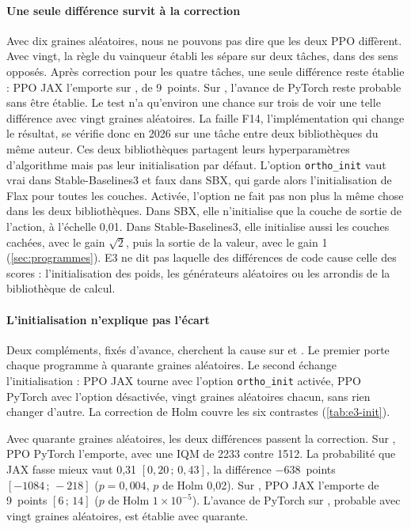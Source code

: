 \paragraph{Une seule différence survit à la correction}
Avec dix graines aléatoires, nous ne pouvons pas dire que les deux PPO diffèrent. Avec vingt, la
règle du vainqueur établi les sépare sur deux tâches, dans des sens opposés. Après correction pour les quatre
tâches, une seule différence reste établie : PPO JAX l'emporte sur , de 9~points. Sur
, l'avance de PyTorch reste probable sans être établie. Le test n'a qu'environ une chance sur
trois de voir une telle différence avec vingt graines aléatoires. La faille F14, l'implémentation qui change
le résultat, se vérifie donc en 2026 sur une tâche entre deux bibliothèques du même auteur. Ces deux
bibliothèques partagent leurs hyperparamètres d'algorithme mais pas leur initialisation par défaut. L'option
\texttt{ortho\_init} vaut vrai dans Stable-Baselines3 et faux dans SBX, qui garde alors l'initialisation de
Flax pour toutes les couches. Activée, l'option ne fait pas non plus la même chose dans les deux
bibliothèques. Dans SBX, elle n'initialise que la couche de sortie de l'action, à l'échelle 0,01. Dans
Stable-Baselines3, elle initialise aussi les couches cachées, avec le gain $\sqrt2$, puis la sortie de la
valeur, avec le gain 1 (\cref{sec:programmes}). E3 ne dit pas laquelle
des différences de code cause celle des scores : l'initialisation des poids, les générateurs aléatoires ou les
arrondis de la bibliothèque de calcul.

\paragraph{L'initialisation n'explique pas l'écart}\label{sec:e3-init}
Deux compléments, fixés d'avance, cherchent la cause sur  et . Le premier porte
chaque programme à quarante graines aléatoires. Le second échange l'initialisation : PPO JAX tourne avec
l'option \texttt{ortho\_init} activée, PPO PyTorch avec l'option désactivée, vingt graines aléatoires chacun,
sans rien changer d'autre. La correction de Holm couvre les six contrastes (\cref{tab:e3-init}).


Avec quarante graines aléatoires, les deux différences passent la correction. Sur , PPO PyTorch
l'emporte, avec une IQM de \num{2233} contre \num{1512}. La probabilité que JAX fasse mieux vaut 0,31
$[0{,}20\,;\,0{,}43]$, la différence $-638$~points $[-\num{1084}\,;\,-218]$ ($p = 0{,}004$, $p$ de Holm 0,02).
Sur , PPO JAX l'emporte de 9~points $[6\,;\,14]$ ($p$ de Holm $1 \times 10^{-5}$). L'avance de
PyTorch sur , probable avec vingt graines aléatoires, est établie avec quarante.

